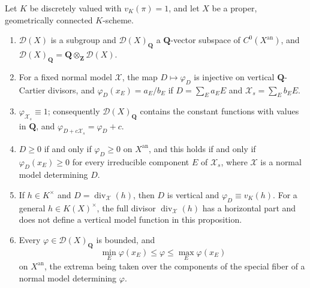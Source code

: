 \begin{proposition}
\label{prop:metrics-divisor-model-function}
Let $K$ be discretely valued with $v_K(\pi)=1$, and let $X$ be a
proper, geometrically connected $K$-scheme.
\begin{enumerate}
\item $\mathcal D(X)$ is a subgroup and $\mathcal D(X)_{\mathbf Q}$ a
$\mathbf Q$-vector subspace of $C^0(X^{\mathrm{an}})$, and
$\mathcal D(X)_{\mathbf Q}=\mathbf Q\otimes_{\mathbf Z}\mathcal D(X)$.
\item For a fixed normal model $\mathcal X$, the map $D\mapsto\varphi_D$
is injective on vertical $\mathbf Q$-Cartier divisors, and
$\varphi_D(x_E)=a_E/b_E$ if $D=\sum_Ea_EE$ and
$\mathcal X_s=\sum_Eb_EE$.
\item $\varphi_{\mathcal X_s}\equiv1$; consequently
$\mathcal D(X)_{\mathbf Q}$ contains the constant functions with values in
$\mathbf Q$, and $\varphi_{D+c\mathcal X_s}=\varphi_D+c$.
\item $D\ge0$ if and only if $\varphi_D\ge0$ on $X^{\mathrm{an}}$, and
this holds if and only if $\varphi_D(x_E)\ge0$ for every irreducible
component $E$ of $\mathcal X_s$, where $\mathcal X$ is a normal model
determining $D$.
\item If $h\in K^\times$ and
$D=\operatorname{div}_{\mathcal X}(h)$, then $D$ is vertical and
$\varphi_D\equiv v_K(h)$.  For a general $h\in K(X)^\times$, the full
divisor $\operatorname{div}_{\mathcal X}(h)$ has a horizontal part and
does not define a vertical model function in this proposition.
\item Every $\varphi\in\mathcal D(X)_{\mathbf Q}$ is bounded, and
\[
 \min_E\varphi(x_E)\le\varphi\le\max_E\varphi(x_E)
\]
on $X^{\mathrm{an}}$, the extrema being taken over the components of the
special fiber of a normal model determining $\varphi$.
\end{enumerate}
\end{proposition}

